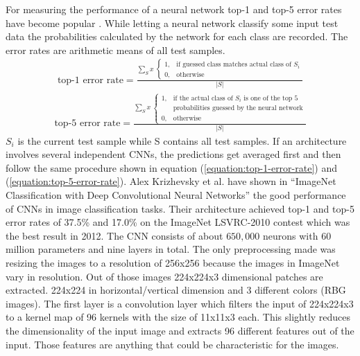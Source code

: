 \documentclass[12pt,twoside]{article}
\theoremstyle{plain}
\theoremstyle{definition}
\theoremstyle{remark}
\begin{document}
For measuring the performance of a neural network top-1 and top-5 error rates have become popular \cite{ImangeNetClassificationCNN-Krizhevsky}. While letting a neural network classify some input test data the probabilities calculated by the network for each class are recorded. The error rates are arithmetic means of all test samples.
\begin{gather}
	\label{equation:top-1-error-rate}
	\text{top-1 error rate} =
	\frac{
		\displaystyle
		\sum_{S} x \;
		\begin{cases}
		1, & \text{if guessed class matches actual class of $S_i$} \\
		0, & \text{otherwise}
		\end{cases}}
		{|S|}
\end{gather}
\begin{gather}
	\label{equation:top-5-error-rate}
	\text{top-5 error rate} =
	\frac{
		\displaystyle
		\sum_{S} x \;
		\begin{cases}
		1, & \text{if the actual class of $S_i$ is one of the top 5} \\
		& \text{probabilities guessed by the neural network} \\
		0, & \text{otherwise}
		\end{cases}}
		{|S|}
\end{gather}
$S_i$ is the current test sample while S contains all test samples. If an architecture involves several independent CNNs, the predictions get averaged first and then follow the same procedure shown in equation (\ref{equation:top-1-error-rate}) and (\ref{equation:top-5-error-rate}).
Alex Krizhevsky et al. have shown in \enquote{ImageNet Classification with Deep Convolutional Neural Networks} \cite{ImangeNetClassificationCNN-Krizhevsky} the good performance of CNNs in image classification tasks. Their architecture achieved top-1 and top-5 error rates of 37.5\% and 17.0\% on the ImageNet LSVRC-2010 contest which was the best result in 2012.
The CNN consists of about $650,000$ neurons with $60$ million parameters and nine layers in total.
The only preprocessing made was resizing the images to a resolution of 256x256 because the images in ImageNet vary in resolution. Out of those images 224x224x3 dimensional patches are extracted. 224x224 in horizontal/vertical dimension and 3 different colors (RBG images). The first layer is a convolution layer which filters the input of 224x224x3 to a kernel map of 96 kernels with the size of 11x11x3 each. This slightly reduces the dimensionality of the input image and extracts 96 different features out of the input. Those features are anything that could be characteristic for the images.
\end{document}
